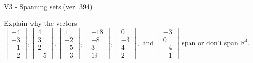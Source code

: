 \begin{exercise}
  \begin{exerciseTitle}V3 - Spanning sets (ver. 394)\end{exerciseTitle}
  \begin{exerciseStatement}
    Explain why the vectors \(\left[\begin{array}{r}
-4 \\
-3 \\
-1 \\
-2
\end{array}\right] , \left[\begin{array}{r}
4 \\
3 \\
2 \\
-5
\end{array}\right] , \left[\begin{array}{r}
1 \\
-2 \\
-5 \\
-3
\end{array}\right] , \left[\begin{array}{r}
-18 \\
-8 \\
3 \\
19
\end{array}\right] , \left[\begin{array}{r}
0 \\
-3 \\
4 \\
2
\end{array}\right] , \text{ and } \left[\begin{array}{r}
-3 \\
0 \\
-4 \\
-1
\end{array}\right]\) span or don't span \(\mathbb{R}^4\). 
	



\end{exerciseStatement}
\end{exercise}
